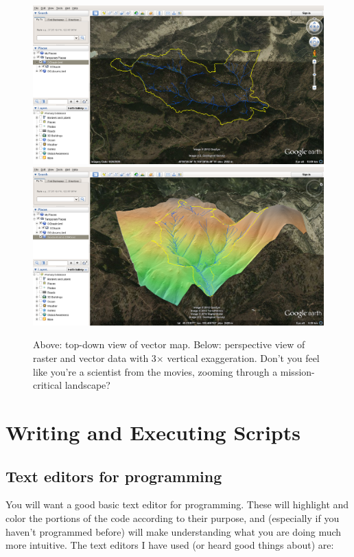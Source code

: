 \documentclass{book}
\begin{document}
\begin{figure}[h]
 \begin{center}
 \includegraphics[width=.9\linewidth]{figures/ubuntu/GoogleEarthVector.png} \\
 \vspace{5mm}
 \includegraphics[width=.9\linewidth]{figures/ubuntu/GG_3x_vert_exxag.png}
 \caption{Above: top-down view of vector map. Below: perspective view of raster and vector data with 3$\times$ vertical exaggeration. Don't you feel like you're a scientist from the movies, zooming through a mission-critical landscape?}
 \label{fig:GoogleEarthGordonGulch}
 \end{center}
\end{figure}

\chapter{Writing and Executing Scripts \label{s:scripts}}

\section{Text editors for programming}

You will want a good basic text editor for programming. These will highlight and color the portions of the code according to their purpose, and (especially if you haven't programmed before) will make understanding what you are doing much more intuitive. The text editors I have used (or heard good things about) are:
\end{document}
